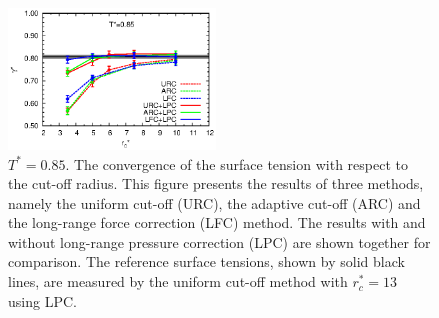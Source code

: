 \documentclass[aps,pre,preprint]{revtex4}
\begin{document}
\begin{figure}
  \centering
  \includegraphics[width=0.49\textwidth]{fig/converge.new/tension.t0.85.eps} 
  \caption{$T^\ast = 0.85$. The convergence of the surface tension
    with respect to the cut-off radius.  This figure presents the
    results of three methods, namely the uniform cut-off (URC), the
    adaptive cut-off (ARC) and the long-range force correction (LFC)
    method.  The results with and without long-range pressure
    correction (LPC) are shown together for comparison. The reference
    surface tensions, shown by solid black lines, are measured by the
    uniform cut-off method with $r_c^\ast=13$ using LPC.}
  \label{fig:tmp6}
\end{figure}
\end{document}
